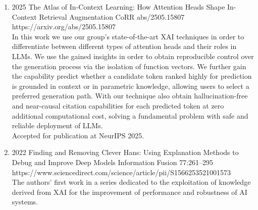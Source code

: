     
        \begin{enumerate}[resume]

            \item {}
                {2025}
                {The Atlas of In-Context Learning: How Attention Heads Shape In-Context Retrieval Augmentation}
                {CoRR abs/2505.15807}
                {https://arxiv.org/abs/2505.15807}
                {
                    \\In this work we use our group's state-of-the-art XAI techniques in order to differentiate between different types of attention heads and their roles in LLMs. We use the gained insights in order to obtain reproducible control over the generation process via the isolation of function vectors. We further gain the capability predict whether a candidate token ranked highly for prediction is grounded  in context or in parametric knowledge, allowing users to select a preferred generation path. With our technique also obtain hallucination-free and near-causal citation capabilities for each predicted token at zero additional computational cost, solving a fundamental problem with safe and reliable deployment of LLMs.
                    \\Accepted for publication at NeurIPS 2025.
                }
        
        
            \item
                            {2022}
                            {Finding and Removing Clever Hans: Using Explanation Methods to Debug and Improve Deep Models}
                            {Information Fusion}
                            {77:261--295}
                            {https://www.sciencedirect.com/science/article/pii/S1566253521001573}
                            {\\
                            The authors' first work in a series dedicated to the exploitation of knowledge derived from XAI for the improvement of performance and robustness of AI systems.}


\end{enumerate}
